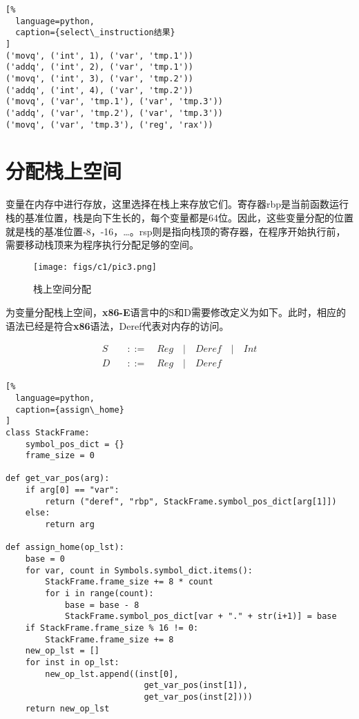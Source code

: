 \begin{lstlisting}[%
  language=python,
  caption={select\_instruction结果}
]
('movq', ('int', 1), ('var', 'tmp.1'))
('addq', ('int', 2), ('var', 'tmp.1'))
('movq', ('int', 3), ('var', 'tmp.2'))
('addq', ('int', 4), ('var', 'tmp.2'))
('movq', ('var', 'tmp.1'), ('var', 'tmp.3'))
('addq', ('var', 'tmp.2'), ('var', 'tmp.3'))
('movq', ('var', 'tmp.3'), ('reg', 'rax'))
\end{lstlisting}

\section{分配栈上空间}

变量在内存中进行存放，这里选择在栈上来存放它们。寄存器rbp是当前函数运行栈的基准位置，栈是向下生长的，每个变量都是64位。因此，这些变量分配的位置就是栈的基准位置-8，-16，…。rsp则是指向栈顶的寄存器，在程序开始执行前，需要移动栈顶来为程序执行分配足够的空间。

\begin{figure}[ht]
\centering
\texttt{[image: figs/c1/pic3.png]}
\caption{栈上空间分配}
\label{fig:fig3}
\end{figure}

为变量分配栈上空间，\textbf{x86-E}语言中的S和D需要修改定义为如下。此时，相应的语法已经是符合\textbf{x86}语法，Deref代表对内存的访问。

\begin{equation}
\begin{aligned}
  \label{eq:5}
   S \quad &::= \quad Reg \quad | \quad Deref \quad | \quad Int \\
   D \quad &::=  \quad Reg \quad | \quad Deref 
\end{aligned}
\end{equation}

\begin{lstlisting}[%
  language=python,
  caption={assign\_home}
]
class StackFrame:
    symbol_pos_dict = {}
    frame_size = 0

def get_var_pos(arg):
    if arg[0] == "var":
        return ("deref", "rbp", StackFrame.symbol_pos_dict[arg[1]])
    else:
        return arg

def assign_home(op_lst):
    base = 0
    for var, count in Symbols.symbol_dict.items():
        StackFrame.frame_size += 8 * count
        for i in range(count):
            base = base - 8
            StackFrame.symbol_pos_dict[var + "." + str(i+1)] = base
    if StackFrame.frame_size % 16 != 0:
        StackFrame.frame_size += 8
    new_op_lst = []
    for inst in op_lst:
        new_op_lst.append((inst[0], 
                            get_var_pos(inst[1]), 
                            get_var_pos(inst[2])))
    return new_op_lst
\end{lstlisting}

